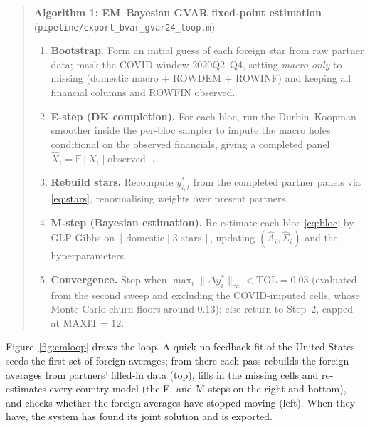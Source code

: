 \documentclass[11pt]{article}
\newcommand{\E}{\mathbb{E}}
\newcommand{\code}[1]{\texttt{\small #1}}
\begin{document}
\begin{quote}
\noindent\textbf{Algorithm 1: EM--Bayesian GVAR fixed-point estimation}
(\code{pipeline/export\_bvar\_gvar24\_loop.m})
\begin{enumerate}
  \item \textbf{Bootstrap.} Form an initial guess of each foreign star from raw partner data; mask the
        COVID window $2020$Q2--Q4, setting \emph{macro only} to missing (domestic macro $+$ ROWDEM $+$
        ROWINF) and keeping all financial columns and ROWFIN observed.
  \item \textbf{E-step (DK completion).} For each bloc, run the Durbin--Koopman smoother inside the
        per-bloc sampler to impute the macro holes conditional on the observed financials, giving a
        completed panel $\widehat X_i = \E[X_i \mid \text{observed}]$.
  \item \textbf{Rebuild stars.} Recompute $y^{*}_{i,t}$ from the completed partner panels via
        \eqref{eq:stars}, renormalising weights over present partners.
  \item \textbf{M-step (Bayesian estimation).} Re-estimate each bloc \eqref{eq:bloc} by GLP Gibbs on
        $[\,\text{domestic}\mid\text{3 stars}\,]$, updating $(\widehat A_i,\widehat\Sigma_i)$ and the
        hyperparameters.
  \item \textbf{Convergence.} Stop when $\max_i\lVert \Delta y^{*}_i\rVert_\infty < \text{TOL}=0.03$
        (evaluated from the second sweep and excluding the COVID-imputed cells, whose Monte-Carlo churn
        floors around $0.13$); else return to Step~2, capped at $\text{MAXIT}=12$.
\end{enumerate}
\end{quote}

Figure~\ref{fig:emloop} draws the loop. A quick no-feedback fit of the United States seeds the first set of
foreign averages; from there each pass rebuilds the foreign averages from partners' filled-in data
(top), fills in the missing cells and re-estimates every country model (the E- and M-steps on the right and
bottom), and checks whether the foreign averages have stopped moving (left). When they have, the system
has found its joint solution and is exported.
\end{document}
